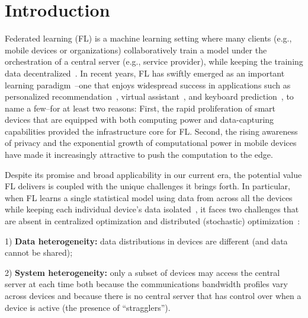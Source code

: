 

\section{Introduction}
Federated learning (FL) is a machine learning setting where many clients (e.g., mobile devices or organizations) collaboratively train a model under the orchestration of a central server (e.g., service provider), while keeping the training data decentralized~\cite{smith2017federated, kairouz2019advances}. In recent years, FL has swiftly emerged as an important learning paradigm~\cite{mcmahan2016communication,li2018federated}--one that enjoys widespread success in applications such as personalized recommendation~\cite{chen2018federated}, virtual assistant~\cite{lamautonomy}, and keyboard prediction~\cite{47586}, to name a few--for at least two reasons: First, the rapid proliferation of smart devices that are equipped with both computing power and data-capturing capabilities provided the infrastructure core for FL. Second, the rising awareness of privacy and the exponential growth of computational power in mobile devices have made it increasingly attractive to push the computation to the edge.

Despite its promise and broad applicability in our current era, the potential value FL delivers is coupled with the unique challenges it brings forth. In particular, when FL learns a single statistical model using data from across all the devices while keeping each individual device's data isolated~\cite{kairouz2019advances}, it faces two challenges that are absent in centralized optimization and distributed (stochastic) optimization~\cite{zhou2017convergence, stich2018local,khaled2019first,liang2019variance,wang2018cooperative,woodworth2018graph,wang2019adaptive,jiang2018linear,yu2019parallel,yu2019linear, khaled2020tighter,koloskova2020unified}:

1) \textbf{Data heterogeneity:} data distributions in devices are different (and data cannot be shared);

2) \textbf{System heterogeneity:} only a subset of devices may access the central server at each time both because the communications bandwidth profiles vary across devices and because there is no central server that has control over when a device is active (the presence of ``stragglers''). 

